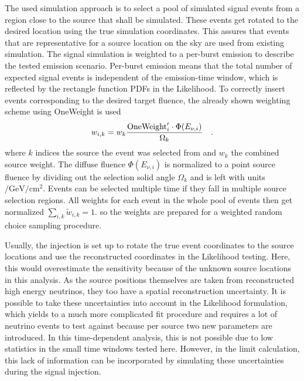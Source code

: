 The used simulation approach is to select a pool of simulated signal events from a region close to the source that shall be simulated.
These events get rotated to the desired location using the true simulation coordinates.
This assures that events that are representative for a source location on the sky are used from existing simulation.
The signal simulation is weighted to a per-burst emission to describe the tested emission scenario.
Per-burst emission means that the total number of expected signal events is independent of the emission-time window, which is reflected by the rectangle function PDFs in the Likelihood.
To correctly insert events corresponding to the desired target fluence, the already shown weighting scheme using OneWeight is used
\begin{equation}
  w_{i,k} = w_k \frac{\text{OneWeight}'_i \cdot \Phi(E_{\nu,i})}{\Omega_k}
  \quad\text{.}
\end{equation}
where $k$ indices the source the event was selected from and $w_k$ the combined source weight.
The diffuse fluence $\Phi(E_{\nu,i})$ is normalized to a point source fluence by dividing out the selection solid angle $\Omega_k$ and is left with units $\si{\per\GeV\per\cm\squared}$.
Events can be selected multiple time if they fall in multiple source selection regions.
All weights for each event in the whole pool of events then get normalized $\sum_{i,k}\tilde{w}_{i,k} = 1$. so the weights are prepared for a weighted random choice sampling procedure.

Usually, the injection is set up to rotate the true event coordinates to the source locations and use the reconstructed coordinates in the Likelihood testing.
Here, this would overestimate the sensitivity because of the unknown source locations in this analysis.
As the source positions themselves are taken from reconstructed high energy neutrinos, they too have a spatial reconstruction uncertainty.
It is possible to take these uncertainties into account in the Likelihood formulation, which yields to a much more complicated fit procedure and requires a lot of neutrino events to test against because per source two new parameters are introduced.
In this time-dependent analysis, this is not possible due to low statistics in the small time windows tested here.
However, in the limit calculation, this lack of information can be incorporated by simulating these uncertainties during the signal injection.

